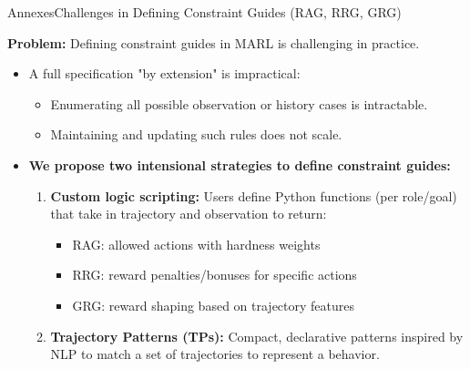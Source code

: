 \begin{frame}{Annexes}{Challenges in Defining Constraint Guides (RAG, RRG, GRG)}

    \textbf{Problem:} Defining constraint guides in MARL is challenging in practice.

    \begin{itemize}
        \item A full specification "by extension" is impractical:
              \begin{itemize}
                  \item Enumerating all possible observation or history cases is intractable.
                  \item Maintaining and updating such rules does not scale.
              \end{itemize}

        \item \textbf{We propose two intensional strategies to define constraint guides:}
              \begin{enumerate}
                  \item \textbf{Custom logic scripting:} Users define Python functions (per role/goal) that take in trajectory and observation to return:
                        \begin{itemize}
                            \item RAG: allowed actions with hardness weights
                            \item RRG: reward penalties/bonuses for specific actions
                            \item GRG: reward shaping based on trajectory features
                        \end{itemize}
                  \item \textbf{Trajectory Patterns (TPs):} Compact, declarative patterns inspired by NLP to match a set of trajectories to represent a behavior.
              \end{enumerate}
    \end{itemize}

\end{frame}


